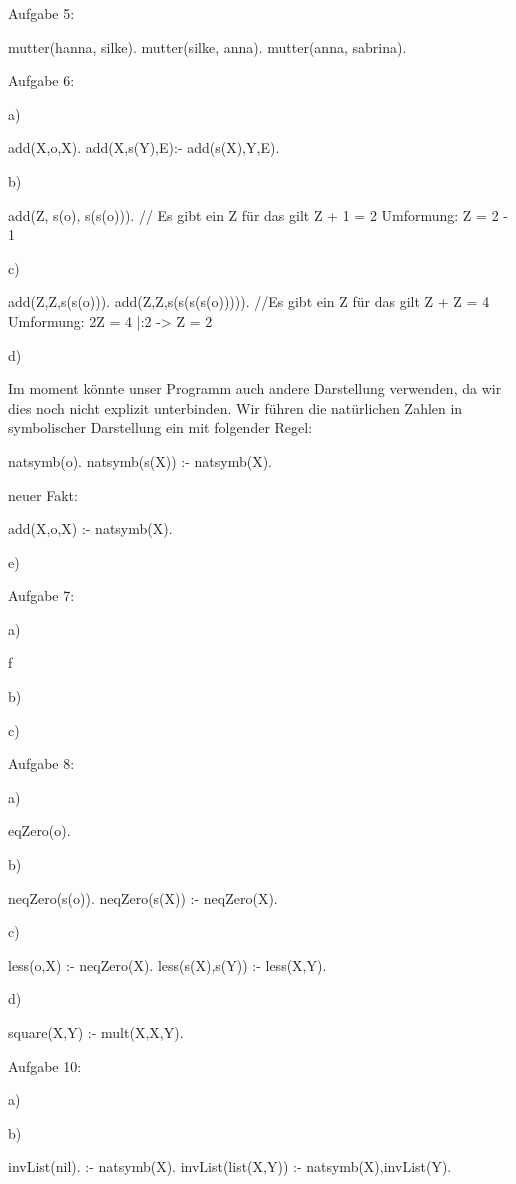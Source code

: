 Aufgabe 5:

mutter(hanna, silke).
mutter(silke, anna).
mutter(anna, sabrina).

Aufgabe 6:

a)

add(X,o,X).
add(X,s(Y),E):- add(s(X),Y,E).

b)

add(Z, s(o), s(s(o))). // Es gibt ein Z für das gilt Z + 1 = 2 Umformung: Z = 2 - 1

c)

add(Z,Z,s(s(o))).
add(Z,Z,s(s(s(s(o))))). //Es gibt ein Z für das gilt Z + Z = 4 Umformung: 2Z = 4 |:2 -> Z = 2

d)

Im moment könnte unser Programm auch andere Darstellung verwenden, da wir dies noch nicht explizit unterbinden.
Wir führen die natürlichen Zahlen in symbolischer Darstellung ein mit folgender Regel:

natsymb(o).
natsymb(s(X)) :- natsymb(X).

neuer Fakt:

add(X,o,X) :- natsymb(X).

e)

Aufgabe 7:

a)

f

b)

c)



Aufgabe 8:

a)

eqZero(o).

b)

neqZero(s(o)).
neqZero(s(X)) :-  neqZero(X).

c)

less(o,X) :- neqZero(X).
less(s(X),s(Y)) :- less(X,Y).

d)

square(X,Y) :- mult(X,X,Y).

Aufgabe 10:

a)


b)

invList(nil). :- natsymb(X).
invList(list(X,Y)) :- natsymb(X),invList(Y).